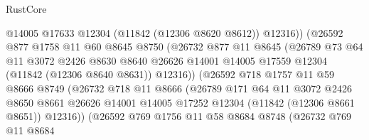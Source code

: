 \begin{lexlean}{RustCore}
\begin{coremodule}
                              @14005
                              @17633
                              @12304
                              (@11842 (@12306 @8620 @8612))
                              @12316))
                          (@26592
                            @877
                            @1758
                            @11
                            @60
                            @8645
                            @8750
                            (@26732
                              @877
                              @11
                              @8645
                              (@26789
                                @73
                                @64
                                @11
                                @3072
                                @2426
                                @8630
                                @8640
                                @26626
                                @14001
                                @14005
                                @17559
                                @12304
                                (@11842 (@12306 @8640 @8631))
                                @12316))
                            (@26592
                              @718
                              @1757
                              @11
                              @59
                              @8666
                              @8749
                              (@26732
                                @718
                                @11
                                @8666
                                (@26789
                                  @171
                                  @64
                                  @11
                                  @3072
                                  @2426
                                  @8650
                                  @8661
                                  @26626
                                  @14001
                                  @14005
                                  @17252
                                  @12304
                                  (@11842 (@12306 @8661 @8651))
                                  @12316))
                              (@26592
                                @769
                                @1756
                                @11
                                @58
                                @8684
                                @8748
                                (@26732
                                  @769
                                  @11
                                  @8684

\end{coremodule}
\end{lexlean}
